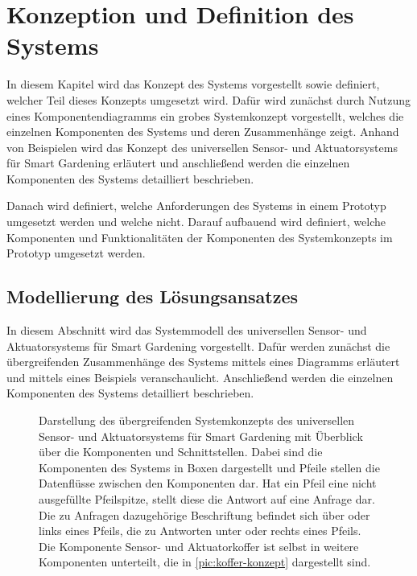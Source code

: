 \chapter{Konzeption und Definition des Systems}\label{ch:konzeption}
In diesem Kapitel wird das Konzept des Systems vorgestellt sowie definiert, welcher Teil dieses Konzepts umgesetzt wird.
Dafür wird zunächst durch Nutzung eines Komponentendiagramms ein grobes Systemkonzept vorgestellt, welches die einzelnen Komponenten des Systems und deren Zusammenhänge zeigt.
Anhand von Beispielen wird das Konzept des universellen Sensor- und Aktuatorsystems für Smart Gardening erläutert und anschließend werden die einzelnen Komponenten des Systems detailliert beschrieben.

Danach wird definiert, welche Anforderungen des Systems in einem Prototyp umgesetzt werden und welche nicht.
Darauf aufbauend wird definiert, welche Komponenten und Funktionalitäten der Komponenten des Systemkonzepts im Prototyp umgesetzt werden.



\section{Modellierung des Lösungsansatzes}\label{sec:modellierung}
In diesem Abschnitt wird das Systemmodell des universellen Sensor- und Aktuatorsystems für Smart Gardening vorgestellt.
Dafür werden zunächst die übergreifenden Zusammenhänge des Systems mittels eines Diagramms erläutert und mittels eines Beispiels veranschaulicht.
Anschließend werden die einzelnen Komponenten des Systems detailliert beschrieben.

\begin{figure}[!htbp]
	\centering
	
	\caption[Darstellung des übergreifenden Systemkonzepts.]{
		Darstellung des übergreifenden Systemkonzepts des universellen Sensor- und Aktuatorsystems für Smart Gardening mit Überblick über die Komponenten und Schnittstellen.
		Dabei sind die Komponenten des Systems in Boxen dargestellt und Pfeile stellen die Datenflüsse zwischen den Komponenten dar.
		Hat ein Pfeil eine nicht ausgefüllte Pfeilspitze, stellt diese die Antwort auf eine Anfrage dar.
		Die zu Anfragen dazugehörige Beschriftung befindet sich über oder links eines Pfeils, die zu Antworten unter oder rechts eines Pfeils.
		Die Komponente Sensor- und Aktuatorkoffer ist selbst in weitere Komponenten unterteilt, die in \cref{pic:koffer-konzept} dargestellt sind.
		}
	\label{pic:systemkonzept}
\end{figure}


